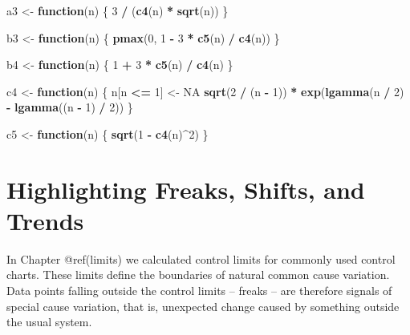 \documentclass[
]{book}
\newenvironment{Shaded}{\begin{snugshade}}{\end{snugshade}}
\newcommand{\ConstantTok}[1]{\textcolor[rgb]{0.56,0.35,0.01}{#1}}
\newcommand{\ControlFlowTok}[1]{\textcolor[rgb]{0.13,0.29,0.53}{\textbf{#1}}}
\newcommand{\DecValTok}[1]{\textcolor[rgb]{0.00,0.00,0.81}{#1}}
\newcommand{\FunctionTok}[1]{\textcolor[rgb]{0.13,0.29,0.53}{\textbf{#1}}}
\newcommand{\NormalTok}[1]{#1}
\newcommand{\OtherTok}[1]{\textcolor[rgb]{0.56,0.35,0.01}{#1}}
\newcommand{\SpecialCharTok}[1]{\textcolor[rgb]{0.81,0.36,0.00}{\textbf{#1}}}
\begin{document}
\begin{Shaded}
\begin{Highlighting}[]
\NormalTok{a3 }\OtherTok{\textless{}{-}} \ControlFlowTok{function}\NormalTok{(n) \{}
  \DecValTok{3} \SpecialCharTok{/}\NormalTok{ (}\FunctionTok{c4}\NormalTok{(n) }\SpecialCharTok{*} \FunctionTok{sqrt}\NormalTok{(n))}
\NormalTok{\}}

\NormalTok{b3 }\OtherTok{\textless{}{-}} \ControlFlowTok{function}\NormalTok{(n) \{}
  \FunctionTok{pmax}\NormalTok{(}\DecValTok{0}\NormalTok{, }\DecValTok{1} \SpecialCharTok{{-}} \DecValTok{3} \SpecialCharTok{*} \FunctionTok{c5}\NormalTok{(n) }\SpecialCharTok{/} \FunctionTok{c4}\NormalTok{(n))}
\NormalTok{\}}

\NormalTok{b4 }\OtherTok{\textless{}{-}} \ControlFlowTok{function}\NormalTok{(n) \{}
  \DecValTok{1} \SpecialCharTok{+} \DecValTok{3} \SpecialCharTok{*} \FunctionTok{c5}\NormalTok{(n) }\SpecialCharTok{/} \FunctionTok{c4}\NormalTok{(n)}
\NormalTok{\}}

\NormalTok{c4 }\OtherTok{\textless{}{-}} \ControlFlowTok{function}\NormalTok{(n) \{}
\NormalTok{  n[n }\SpecialCharTok{\textless{}=} \DecValTok{1}\NormalTok{] }\OtherTok{\textless{}{-}} \ConstantTok{NA}
  \FunctionTok{sqrt}\NormalTok{(}\DecValTok{2} \SpecialCharTok{/}\NormalTok{ (n }\SpecialCharTok{{-}} \DecValTok{1}\NormalTok{)) }\SpecialCharTok{*} \FunctionTok{exp}\NormalTok{(}\FunctionTok{lgamma}\NormalTok{(n }\SpecialCharTok{/} \DecValTok{2}\NormalTok{) }\SpecialCharTok{{-}} \FunctionTok{lgamma}\NormalTok{((n }\SpecialCharTok{{-}} \DecValTok{1}\NormalTok{) }\SpecialCharTok{/} \DecValTok{2}\NormalTok{))}
\NormalTok{\}}

\NormalTok{c5 }\OtherTok{\textless{}{-}} \ControlFlowTok{function}\NormalTok{(n) \{}
  \FunctionTok{sqrt}\NormalTok{(}\DecValTok{1} \SpecialCharTok{{-}} \FunctionTok{c4}\NormalTok{(n)}\SpecialCharTok{\^{}}\DecValTok{2}\NormalTok{)}
\NormalTok{\}}
\end{Highlighting}
\end{Shaded}

\chapter{Highlighting Freaks, Shifts, and Trends}\label{highlighting}

In Chapter @ref(limits) we calculated control limits for commonly used
control charts. These limits define the boundaries of natural common
cause variation. Data points falling outside the control limits --
freaks -- are therefore signals of special cause variation, that is,
unexpected change caused by something outside the usual system.
\end{document}
